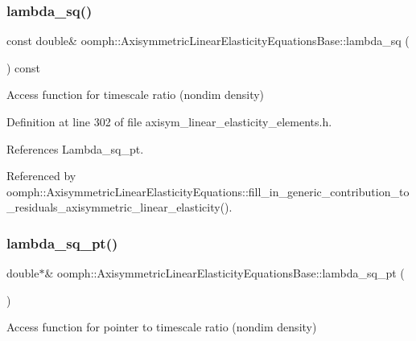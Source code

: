 \subsubsection{\texorpdfstring{lambda\+\_\+sq()}{lambda\_sq()}}
{\footnotesize\ttfamily const double\& oomph\+::\+Axisymmetric\+Linear\+Elasticity\+Equations\+Base\+::lambda\+\_\+sq (\begin{DoxyParamCaption}{ }\end{DoxyParamCaption}) const\hspace{0.3cm}{\ttfamily [inline]}}



Access function for timescale ratio (nondim density) 



Definition at line 302 of file axisym\+\_\+linear\+\_\+elasticity\+\_\+elements.\+h.



References Lambda\+\_\+sq\+\_\+pt.



Referenced by oomph\+::\+Axisymmetric\+Linear\+Elasticity\+Equations\+::fill\+\_\+in\+\_\+generic\+\_\+contribution\+\_\+to\+\_\+residuals\+\_\+axisymmetric\+\_\+linear\+\_\+elasticity().

\mbox{\label{classoomph_1_1AxisymmetricLinearElasticityEquationsBase_ab001e2105e0f6e606299bdf8e7b8189e}} 
\subsubsection{\texorpdfstring{lambda\+\_\+sq\+\_\+pt()}{lambda\_sq\_pt()}}
{\footnotesize\ttfamily double$\ast$\& oomph\+::\+Axisymmetric\+Linear\+Elasticity\+Equations\+Base\+::lambda\+\_\+sq\+\_\+pt (\begin{DoxyParamCaption}{ }\end{DoxyParamCaption})\hspace{0.3cm}{\ttfamily [inline]}}



Access function for pointer to timescale ratio (nondim density) 



